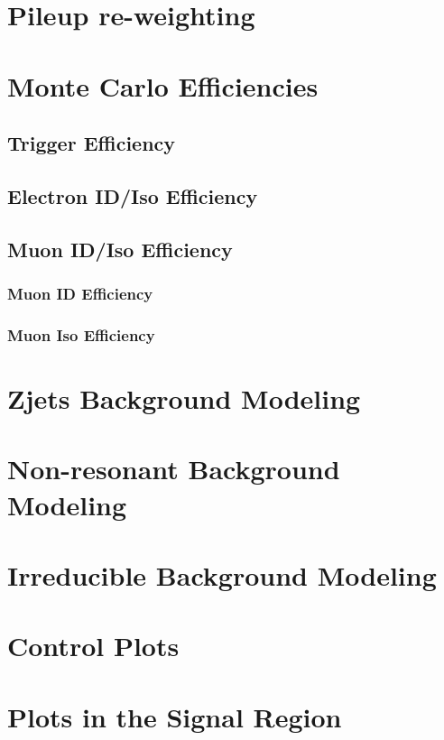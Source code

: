 \section{Pileup re-weighting}
\section{Monte Carlo Efficiencies}
\subsection{Trigger Efficiency}
\subsection{Electron ID/Iso Efficiency}
\subsection{Muon ID/Iso Efficiency}
\subsubsection{Muon ID Efficiency}
\subsubsection{Muon Iso Efficiency}

\section{Zjets Background Modeling}\label{sec:dybk}

\section{Non-resonant Background Modeling}

\section{Irreducible Background Modeling}

\section{Control Plots}

\section{Plots in the Signal Region}
